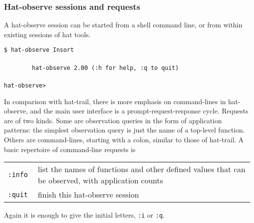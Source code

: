 \documentclass[12pt]{article}
\begin{document}
\subsubsection*{Hat-observe sessions and requests}
A hat-observe session can be started from a shell command line, or from
within existing sessions of hat tools.
\begin{tabbing}
{\tt \$ hat-observe Insort} \\ \\
{\tt \ \ \ \ \ \ \ \ hat-observe 2.00  (:h for help, :q to quit)} \\ \\
{\tt hat-observe>} \\
\end{tabbing}
In comparison with hat-trail, there is more emphasis on command-lines
in hat-observe,
and the main user interface is a prompt-request-response
cycle.
Requests are of two kinds.
Some are observation queries in the
form of application patterns:
the simplest observation query is just the name of a top-level function.
Others are command-lines, starting with
a colon, similar to those of hat-trail.
A basic repertoire of command-line requests is
\begin{center}
\begin{tabular*}{\textwidth}{lp{10cm}}
{\tt :info } & list the names of functions and other defined
               values that can be observed, with application counts \\
{\tt :quit}  & finish this hat-observe session \\
\end{tabular*}
\end{center}
Again it is enough to give the initial letters, {\tt :i} or {\tt :q}.
\end{document}
